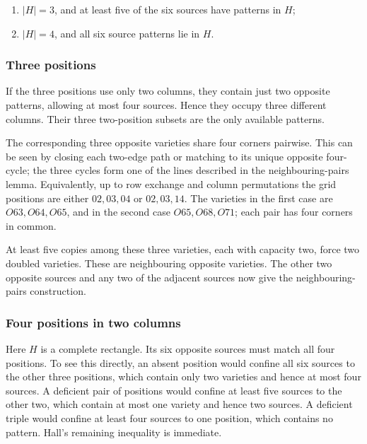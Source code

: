 \documentclass[
  10pt,
]{article}
\providecommand{\tightlist}{%
  \setlength{\itemsep}{0pt}\setlength{\parskip}{0pt}}
\begin{document}
\begin{enumerate}
\def\labelenumi{\arabic{enumi}.}
\tightlist
\item
  \(|H|=3\), and at least five of the six sources have patterns in
  \(H\);
\item
  \(|H|=4\), and all six source patterns lie in \(H\).
\end{enumerate}

\hypertarget{three-positions}{%
\subsubsection*{Three positions}\label{three-positions}}

If the three positions use only two columns, they contain just two
opposite patterns, allowing at most four sources. Hence they occupy
three different columns. Their three two-position subsets are the only
available patterns.

The corresponding three opposite varieties share four corners pairwise.
This can be seen by closing each two-edge path or matching to its unique
opposite four-cycle; the three cycles form one of the lines described in
the neighbouring-pairs lemma. Equivalently, up to row exchange and
column permutations the grid positions are either \(02,03,04\) or
\(02,03,14\). The varieties in the first case are \(O63,O64,O65\), and
in the second case \(O65,O68,O71\); each pair has four corners in
common.

At least five copies among these three varieties, each with capacity
two, force two doubled varieties. These are neighbouring opposite
varieties. The other two opposite sources and any two of the adjacent
sources now give the neighbouring-pairs construction.

\hypertarget{four-positions-in-two-columns}{%
\subsubsection*{Four positions in two
columns}\label{four-positions-in-two-columns}}

Here \(H\) is a complete rectangle. Its six opposite sources must match
all four positions. To see this directly, an absent position would
confine all six sources to the other three positions, which contain only
two varieties and hence at most four sources. A deficient pair of
positions would confine at least five sources to the other two, which
contain at most one variety and hence two sources. A deficient triple
would confine at least four sources to one position, which contains no
pattern. Hall's remaining inequality is immediate.
\end{document}
